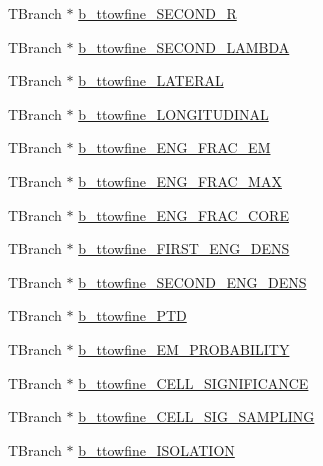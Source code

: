 \begin{DoxyCompactItemize}
\item 
T\+Branch $\ast$ \hyperlink{classXMLWriter_adb81662bc3421137465ff69ad48b861e}{b\+\_\+ttowfine\+\_\+\+S\+E\+C\+O\+N\+D\+\_\+R}
\item 
T\+Branch $\ast$ \hyperlink{classXMLWriter_ad2cf096406371b3952d806b644872c1b}{b\+\_\+ttowfine\+\_\+\+S\+E\+C\+O\+N\+D\+\_\+\+L\+A\+M\+B\+DA}
\item 
T\+Branch $\ast$ \hyperlink{classXMLWriter_a2111eef8919f87f8d2692fb570045646}{b\+\_\+ttowfine\+\_\+\+L\+A\+T\+E\+R\+AL}
\item 
T\+Branch $\ast$ \hyperlink{classXMLWriter_ac12df3ab7f84724750b8843586c74cd3}{b\+\_\+ttowfine\+\_\+\+L\+O\+N\+G\+I\+T\+U\+D\+I\+N\+AL}
\item 
T\+Branch $\ast$ \hyperlink{classXMLWriter_a53e9b2d5003f6ddee54ef9311ff706fc}{b\+\_\+ttowfine\+\_\+\+E\+N\+G\+\_\+\+F\+R\+A\+C\+\_\+\+EM}
\item 
T\+Branch $\ast$ \hyperlink{classXMLWriter_ad532039f631f19b676a567185d949585}{b\+\_\+ttowfine\+\_\+\+E\+N\+G\+\_\+\+F\+R\+A\+C\+\_\+\+M\+AX}
\item 
T\+Branch $\ast$ \hyperlink{classXMLWriter_a90f701687158bf57bd0efe93b9e63eaf}{b\+\_\+ttowfine\+\_\+\+E\+N\+G\+\_\+\+F\+R\+A\+C\+\_\+\+C\+O\+RE}
\item 
T\+Branch $\ast$ \hyperlink{classXMLWriter_ac2d006e7973750c5ef66367574e0f907}{b\+\_\+ttowfine\+\_\+\+F\+I\+R\+S\+T\+\_\+\+E\+N\+G\+\_\+\+D\+E\+NS}
\item 
T\+Branch $\ast$ \hyperlink{classXMLWriter_a1a37e06a7447c42cdebb57295afa1e96}{b\+\_\+ttowfine\+\_\+\+S\+E\+C\+O\+N\+D\+\_\+\+E\+N\+G\+\_\+\+D\+E\+NS}
\item 
T\+Branch $\ast$ \hyperlink{classXMLWriter_a0ed8f167bf7c44c9ff1d607311928d42}{b\+\_\+ttowfine\+\_\+\+P\+TD}
\item 
T\+Branch $\ast$ \hyperlink{classXMLWriter_a58a139c932f631c443f7a15ce8b8fb18}{b\+\_\+ttowfine\+\_\+\+E\+M\+\_\+\+P\+R\+O\+B\+A\+B\+I\+L\+I\+TY}
\item 
T\+Branch $\ast$ \hyperlink{classXMLWriter_a55be0e85750ffd9cbb8574d03725f06e}{b\+\_\+ttowfine\+\_\+\+C\+E\+L\+L\+\_\+\+S\+I\+G\+N\+I\+F\+I\+C\+A\+N\+CE}
\item 
T\+Branch $\ast$ \hyperlink{classXMLWriter_ab24df8c28ce993b80f7fde935aa0bfa7}{b\+\_\+ttowfine\+\_\+\+C\+E\+L\+L\+\_\+\+S\+I\+G\+\_\+\+S\+A\+M\+P\+L\+I\+NG}
\item 
T\+Branch $\ast$ \hyperlink{classXMLWriter_af529970ae534e476c2470eaebfad2c0c}{b\+\_\+ttowfine\+\_\+\+I\+S\+O\+L\+A\+T\+I\+ON}
\item 

\end{DoxyCompactItemize}
